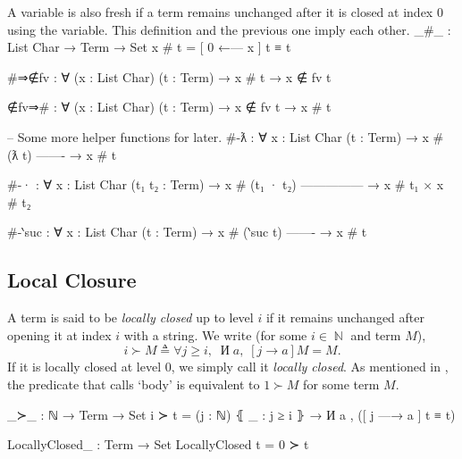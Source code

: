 \documentclass[logo,bsc,singlespacing,parskip,online]{infthesis}
\DeclareMathOperator{\nat}{\mathbb{N}}
\DeclareMathOperator{\cof}{\text{И}}
\renewenvironment{code}{\mintedcopy[breaklines,breaksymbolleft=\;]{agda}}{\endmintedcopy}
\begin{document}
A variable is also fresh if a term remains unchanged after it is closed at index $0$ using the
variable. This definition and the previous one imply each other.
\begin{code}
_#_ : List Char → Term → Set
x # t = [ 0 ←— x ] t ≡ t

#⇒∉fv : ∀ (x : List Char) (t : Term) → x # t → x ∉ fv t

∉fv⇒# : ∀ (x : List Char) (t : Term) → x ∉ fv t → x # t

-- Some more helper functions for later.
#-ƛ : ∀ {x : List Char} (t : Term)
  → x # (ƛ t)
    -------
  → x # t

#-· : ∀ {x : List Char} (t₁ t₂ : Term)
  → x # (t₁ · t₂)
    ---------------
  → x # t₁ × x # t₂

#-‵suc : ∀ {x : List Char} (t : Term)
  → x # (‵suc t)
    -------
  → x # t
\end{code}

\subsection{Local Closure}
A term is said to be \textit{locally closed} up to level $i$ if it remains unchanged after opening
it at index $i$ with a string. We write (for some $i \in \nat$ and term $M$),
\begin{equation*}
  i \succ M \triangleq \forall j \geq i, \; \cof a , \; [j \to a] M = M.  
\end{equation*}
If it is locally closed at level $0$, we simply call it \textit{locally closed}. As mentioned in \citet{pitts_locally_2023}, the predicate that \citet{chargueraud_locally_2012} calls `body' is equivalent to $1 \succ M$ for some term $M$.

\begin{code}
_≻_ : ℕ → Term → Set
i ≻ t = (j : ℕ) ⦃ _ : j ≥ i ⦄ → И a , ([ j —→ a ] t ≡ t)

LocallyClosed_ : Term → Set
LocallyClosed t = 0 ≻ t
\end{code}
\end{document}
